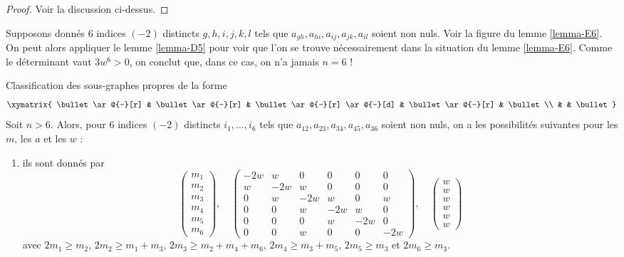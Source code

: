 \begin{proof}
Voir la discussion ci-dessus.
\end{proof}

\noindent
Supposons donnés $6$ indices $(-2)$ distincts $g, h, i, j, k, l$
tels que $a_{gh}, a_{hi}, a_{ij}, a_{jk}, a_{il}$ soient non nuls.
Voir la figure du lemme \ref{lemma-E6}. On peut alors appliquer le
lemme \ref{lemma-D5} pour voir que l'on se trouve nécessairement dans la situation
du lemme \ref{lemma-E6}. Comme le déterminant vaut $3w^6 > 0$,
on conclut que, dans ce cas, on n'a jamais $n = 6$ !

\begin{lemma}
\label{lemma-E6}
Classification des sous-graphes propres de la forme
$$
\xymatrix{
\bullet \ar@{-}[r] & \bullet \ar@{-}[r] & \bullet \ar@{-}[r] \ar@{-}[d] &
\bullet \ar@{-}[r] & \bullet \\
& & \bullet
}
$$
Soit $n > 6$. Alors, pour $6$ indices $(-2)$ distincts
$i_1,\allowbreak \ldots,\allowbreak i_6$ tels que
$a_{12},\allowbreak a_{23},\allowbreak a_{34},\allowbreak
a_{45},\allowbreak a_{36}$ soient non nuls, on a
les possibilités suivantes pour les $m$, les $a$ et les $w$ :
\begin{enumerate}
\item
\label{item-E6}
ils sont donnés par
$$
\left(
\begin{matrix}
m_1 \\
m_2 \\
m_3 \\
m_4 \\
m_5 \\
m_6
\end{matrix}
\right),
\quad
\left(
\begin{matrix}
-2w & w & 0 & 0 & 0 & 0 \\
w & -2w & w & 0 & 0 & 0 \\
0 & w & -2w & w & 0 & w \\
0 & 0 & w & -2w & w & 0 \\
0 & 0 & 0 & w & -2w & 0 \\
0 & 0 & w & 0 & 0 & -2w
\end{matrix}
\right),
\quad
\left(
\begin{matrix}
w \\
w \\
w \\
w \\
w \\
w
\end{matrix}
\right)
$$
avec $2m_1 \geq m_2$, $2m_2 \geq m_1 + m_3$, $2m_3 \geq m_2 + m_4 + m_6$,
$2m_4 \geq m_3 + m_5$, $2m_5 \geq m_3$ et $2m_6 \geq m_3$.
\end{enumerate}
\end{lemma}


